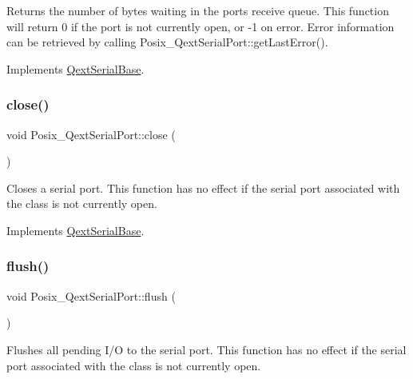 Returns the number of bytes waiting in the port\textquotesingle{}s receive queue. This function will return 0 if the port is not currently open, or -\/1 on error. Error information can be retrieved by calling Posix\+\_\+\+Qext\+Serial\+Port\+::get\+Last\+Error(). 

Implements \mbox{\hyperlink{class_qext_serial_base}{Qext\+Serial\+Base}}.

\mbox{\label{class_posix___qext_serial_port_a3a7ddf86a867770c88777c3e78545cb0}} 
\subsubsection{\texorpdfstring{close()}{close()}}
{\footnotesize\ttfamily void Posix\+\_\+\+Qext\+Serial\+Port\+::close (\begin{DoxyParamCaption}{ }\end{DoxyParamCaption})\hspace{0.3cm}{\ttfamily [virtual]}}

Closes a serial port. This function has no effect if the serial port associated with the class is not currently open. 

Implements \mbox{\hyperlink{class_qext_serial_base}{Qext\+Serial\+Base}}.

\mbox{\label{class_posix___qext_serial_port_a5f12a1a6c1c6a163fe146272e9a7d275}} 
\subsubsection{\texorpdfstring{flush()}{flush()}}
{\footnotesize\ttfamily void Posix\+\_\+\+Qext\+Serial\+Port\+::flush (\begin{DoxyParamCaption}{ }\end{DoxyParamCaption})\hspace{0.3cm}{\ttfamily [virtual]}}

Flushes all pending I/O to the serial port. This function has no effect if the serial port associated with the class is not currently open. 

